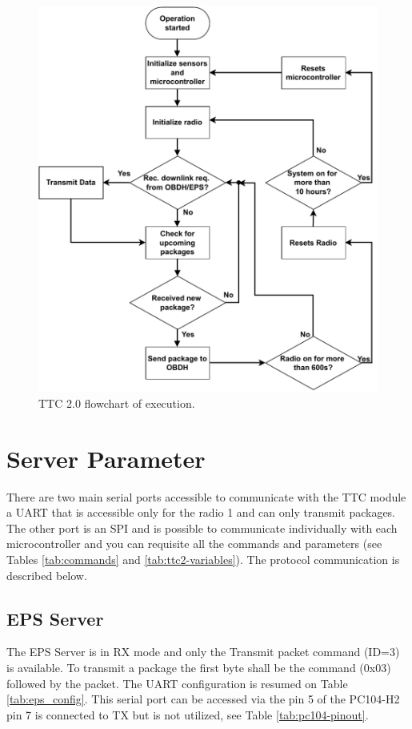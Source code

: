 \begin{figure}[!ht]
    \begin{center}
        \includegraphics[width=\textwidth]{figures/ttc2-flowchart.pdf}
        \caption{TTC 2.0 flowchart of execution.}
        \label{fig:ttc_flowchart}
    \end{center}
\end{figure}

\section{Server Parameter}\label{sec:server_param}

There are two main serial ports accessible to communicate with the TTC module a UART that is accessible only for the radio 1 and can only transmit packages. The other port is an SPI and is possible to communicate individually with each microcontroller and you can requisite all the commands and parameters (see Tables \ref{tab:commands} and \ref{tab:ttc2-variables}). The protocol communication is described below.

\subsection{EPS Server}
The EPS Server is in RX mode and only the Transmit packet command (ID=3) is available. To transmit a package the first byte shall be the command (0x03) followed by the packet. The UART configuration is resumed on Table \ref{tab:eps_config}. This serial port can be accessed via the pin 5 of the PC104-H2 pin 7 is connected to TX but is not utilized, see Table \ref{tab:pc104-pinout}.


